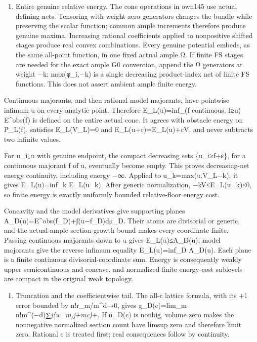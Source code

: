 \documentclass[
  10pt,
]{article}
\providecommand{\tightlist}{%
  \setlength{\itemsep}{0pt}\setlength{\parskip}{0pt}}
\begin{document}
\begin{enumerate}
\def\labelenumi{\arabic{enumi}.}
\setcounter{enumi}{5}
\tightlist
\item
  Entire genuine relative energy. The cone operations in own145 use
  actual defining nets. Tensoring with weight-zero generators changes
  the bundle while preserving the scalar function; common ample
  increments therefore produce genuine maxima. Increasing rational
  coefficients applied to nonpositive shifted stages produce real convex
  combinations. Every genuine potential embeds, as the same all-point
  function, in one fixed actual ample Ω. If finite FS stages are needed
  for the exact ample G0 convention, append the Ω generators at weight
  −k: max(φ\_i,−k) is a single decreasing product-index net of finite FS
  functions. This does not assert ambient ample finite energy.
\end{enumerate}

Continuous majorants, and then rational model majorants, have pointwise
infimum u on every analytic point. Therefore E\_L(u)=inf\_(f continuous,
f≥u) E\^{}obs(f) is defined on the entire actual cone. It agrees with
obstacle energy on P\_L(f), satisfies E\_L(V\_L)=0 and
E\_L(u+c)=E\_L(u)+cV, and never subtracts two infinite values.

For u\_i↓u with genuine endpoint, the compact decreasing sets
\{u\_i≥f+ε\}, for a continuous majorant f of u, eventually become empty.
This proves decreasing-net energy continuity, including energy −∞.
Applied to u\_k=max(u,V\_L−k), it gives E\_L(u)=inf\_k E\_L(u\_k). After
generic normalization, −kV≤E\_L(u\_k)≤0, so finite energy is exactly
uniformly bounded relative-floor energy cost.

Concavity and the model derivatives give supporting planes
A\_D(u)=E\^{}obs(f\_D)+∫(u−f\_D)dμ\_D. Their atoms are divisorial or
generic, and the actual-ample section-growth bound makes every
coordinate finite. Passing continuous majorants down to u gives
E\_L(u)≤A\_D(u); model majorants give the reverse infimum equality
E\_L(u)=inf\_D A\_D(u). Each plane is a finite continuous
divisorial-coordinate sum. Energy is consequently weakly upper
semicontinuous and concave, and normalized finite energy-cost sublevels
are compact in the original weak topology.

\begin{enumerate}
\def\labelenumi{\arabic{enumi}.}
\setcounter{enumi}{6}
\tightlist
\item
  Truncation and the coefficientwise tail. The all-c lattice formula,
  with its +1 error bounded by n!r\_m/m\^{}d→0, gives g\_D(c)=lim\_m
  n!m\^{}(−d)∑\emph{j(w\_m,j+mc)}+. If α\_D(c) is nonbig, volume zero
  makes the nonnegative normalized section count have limsup zero and
  therefore limit zero. Rational c is treated first; real consequences
  follow by continuity.
\end{enumerate}
\end{document}
